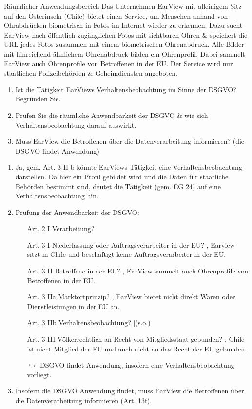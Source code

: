 \documentclass{article}
\begin{document}
\begin{exercise}{Räumlicher Anwendungsbereich}
  Das Unternehmen EarView mit alleinigem Sitz auf den Osterinseln (Chile) bietet einen Service, um Menschen anhand von Ohrabdrücken biometrisch in Fotos im Internet wieder zu erkennen. Dazu sucht EarView nach öffentlich zugänglichen Fotos mit sichtbaren Ohren \& speichert die URL jedes Fotos zusammen mit einem biometrischen Ohrenabdruck. Alle Bilder mit hinreichend ähnlichem Ohrenabdruck bilden ein Ohrenprofil. Dabei sammelt EarView auch Ohrenprofile von Betroffenen in der EU. Der Service wird nur staatlichen Polizeibehörden \& Geheimdiensten angeboten.
  \begin{enumerate}
    \item Ist die Tätigkeit EarViews Verhaltensbeobachtung im Sinne der DSGVO? Begründen Sie.
    \item Prüfen Sie die räumliche Anwendbarkeit der DSGVO \& wie sich Verhaltensbeobachtung darauf auswirkt.
    \item Muss EarView die Betroffenen über die Datenverarbeitung informieren? (die DSGVO findet Anwendung)
  \end{enumerate}

  \begin{solution}
    \begin{enumerate}
      \item Ja, gem. Art. 3 II b könnte EarViews Tätigkeit eine Verhaltensbeobachtung darstellen. Da hier ein Profil gebildet wird und die Daten für staatliche Behörden bestimmt sind, deutet die Tätigkeit (gem. EG 24) auf eine Verhaltensbeobachtung hin.
      \item Prüfung der Anwendbarkeit der DSGVO:
            \begin{itemize}
              \item[Art. 2 I] Verarbeitung? \checkmark
              \item[Art. 3 I] Niederlassung oder Auftragsverarbeiter in der EU? \xmark, Earview sitzt in Chile und beschäftigt keine Auftragsverarbeiter in der EU.
              \item[Art. 3 II] Betroffene in der EU? \checkmark, EarView sammelt auch Ohrenprofile von Betroffenen in der EU.
              \item[Art. 3 IIa] Marktortprinzip? \xmark, EarView bietet nicht direkt Waren oder Dienstleistungen in der EU an.
              \item[Art. 3 IIb] Verhaltensbeobachtung? \checkmark$|$\xmark (s.o.)
              \item[Art. 3 III] Völkerrechtlich an Recht von Mitgliedsstaat gebunden? \xmark, Chile ist nicht Mitglied der EU und auch nicht an das Recht der EU gebunden.
              \item[$\hookrightarrow$] DSGVO findet Anwendung, insofern eine Verhaltensbeobachtung vorliegt.
            \end{itemize}
      \item Insofern die DSGVO Anwendung findet, muss EarView die Betroffenen über die Datenverarbeitung informieren (Art. 13f).
    \end{enumerate}
  \end{solution}
\end{exercise}
\end{document}
